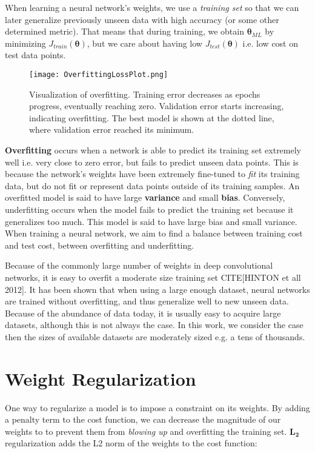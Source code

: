 When learning a neural network's weights, we use a \textit{training set} so that we can later generalize
previously unseen data with high accuracy (or some other determined metric). That means that during training, we
obtain $\bm{\theta}_{ML}$ by minimizing $J_{train}(\bm{\theta})$, but we care about having low $J_{test}(\bm{\theta})$ i.e. low cost
on test data points.

\begin{figure}[h]
\caption{Visualization of overfitting. Training error decreases as epochs progress, eventually reaching zero.
Validation error starts increasing, indicating overfitting. The best model is shown at the dotted line, where
validation error reached its minimum.}
\centering
\texttt{[image: OverfittingLossPlot.png]}
\end{figure}

\textbf{Overfitting} occurs when a network is able to predict its training set extremely well i.e. very close to zero error, but fails to predict
unseen data points. This is because the network's weights have been extremely fine-tuned to \textit{fit} its training data, but do not fit or represent
data points outside of its training samples.
An overfitted model is said to have large \textbf{variance} and small \textbf{bias}. Conversely, underfitting occurs when the model fails to predict
the training set because it generalizes too much. This model is said to have large bias and small variance. When training a neural network,
we aim to find a balance between training cost and test cost, between overfitting and underfitting.

Because of the commonly large number of weights in deep convolutional networks, it is easy to overfit a moderate size training set CITE[HINTON et all 2012].
It has been shown that when using a large enough dataset, neural networks are trained without overfitting, and thus generalize well
to new unseen data. Because of the abundance of data today, it is usually easy to acquire large datasets, although this is not always the case.
In this work, we consider the case then the sizes of available datasets are moderately sized e.g. a tens of thousands.

\section{Weight Regularization}
One way to regularize a model is to impose a constraint on its weights. By adding a penalty term to the cost function, we can decrease the
magnitude of our weights to to prevent them from \textit{blowing up} and overfitting the training set. $\bm{L_2}$ regularization
adds the L2 norm of the weights to the cost function:

